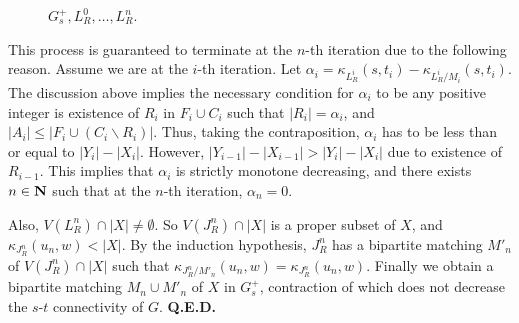 \documentclass{article}
\begin{document}
\begin{figure}\begin{center}
\caption[Fig11]{$G_s^+, L_R^0, \ldots, L_R^n$.}
\label{label_fig11}
\end{center}\end{figure}

This process is guaranteed to terminate at the $n$-th iteration due to the following reason.
Assume we are at the $i$-th iteration. Let $\alpha_i = \kappa_{L_R^i}(s, t_i) - \kappa_{L_R^i/M_i}(s, t_i)$.
The discussion above implies the necessary condition for $\alpha_i$ to be any positive integer
is existence of $R_i$ in $F_i \cup C_i$ such that $|R_i| = \alpha_i$, and $|A_i| \le |F_i \cup (C_i \backslash R_i)|$.
Thus, taking the contraposition, $\alpha_i$ has to be less than or equal to $|Y_i| - |X_i|$.
However, $|Y_{i-1}| - |X_{i-1}| > |Y_{i}| - |X_{i}|$ due to existence of $R_{i-1}$.
This implies that $\alpha_i$ is strictly monotone decreasing,
and there exists $n \in {\bf N}$ such that at the $n$-th iteration,
$\alpha_n = 0$.

Also, $V(L_R^n)\cap |X| \ne \emptyset$.
So $V(J_R^n)\cap |X|$ is a proper subset of $X$, and $\kappa_{J_R^n}(u_n, w) < |X|$.
By the induction hypothesis, $J_R^n$ has a bipartite matching $M'_n$ of $V(J_R^n)\cap |X|$
such that $\kappa_{J_R^n/M'_n}(u_n, w) = \kappa_{J_R^n}(u_n, w)$.
Finally we obtain a bipartite matching $M_n \cup M'_n$ of $X$ in $G_s^+$, contraction of which does not decrease the
$s$-$t$ connectivity of $G$. {\bf Q.E.D.}




\end{document}
